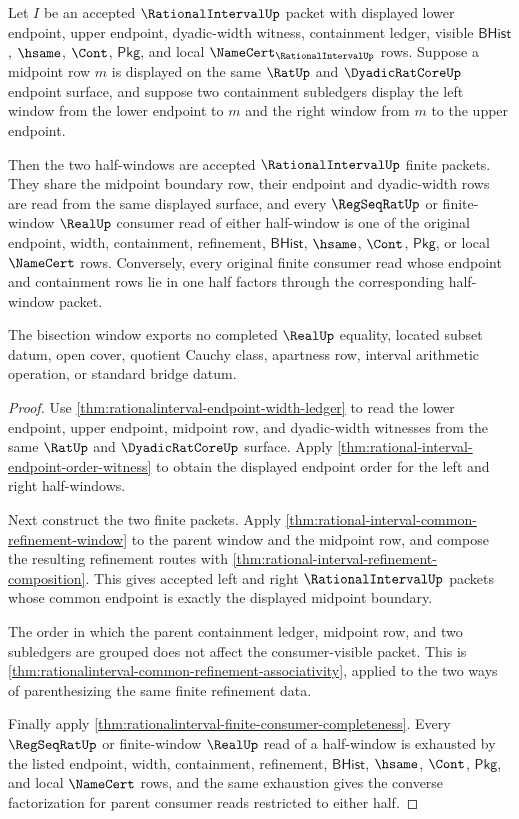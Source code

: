 \begin{theorem}
\label{thm:rationalinterval-midpoint-bisection-window}
Let $I$ be an accepted $\RationalIntervalUp$ packet with displayed lower
endpoint, upper endpoint, dyadic-width witness, containment ledger, visible
$\mathsf{BHist}$, $\hsame$, $\Cont$, $\mathsf{Pkg}$, and local
$\NameCert_{\RationalIntervalUp}$ rows. Suppose a midpoint row $m$ is displayed
on the same $\RatUp$ and $\DyadicRatCoreUp$ endpoint surface, and suppose two
containment subledgers display the left window from the lower endpoint to $m$
and the right window from $m$ to the upper endpoint.

Then the two half-windows are accepted $\RationalIntervalUp$ finite packets.
They share the midpoint boundary row, their endpoint and dyadic-width rows are
read from the same displayed surface, and every $\RegSeqRatUp$ or finite-window
$\RealUp$ consumer read of either half-window is one of the original endpoint,
width, containment, refinement, $\mathsf{BHist}$, $\hsame$, $\Cont$,
$\mathsf{Pkg}$, or local $\NameCert$ rows. Conversely, every original finite
consumer read whose endpoint and containment rows lie in one half factors
through the corresponding half-window packet.

The bisection window exports no completed $\RealUp$ equality, located subset
datum, open cover, quotient Cauchy class, apartness row, interval arithmetic
operation, or standard bridge datum.
\end{theorem}
\begin{proof}
Use \autoref{thm:rationalinterval-endpoint-width-ledger} to read the lower
endpoint, upper endpoint, midpoint row, and dyadic-width witnesses from the
same $\RatUp$ and $\DyadicRatCoreUp$ surface. Apply
\autoref{thm:rational-interval-endpoint-order-witness} to obtain the displayed
endpoint order for the left and right half-windows.

Next construct the two finite packets. Apply
\autoref{thm:rational-interval-common-refinement-window} to the parent window
and the midpoint row, and compose the resulting refinement routes with
\autoref{thm:rational-interval-refinement-composition}. This gives accepted
left and right $\RationalIntervalUp$ packets whose common endpoint is exactly
the displayed midpoint boundary.

The order in which the parent containment ledger, midpoint row, and two
subledgers are grouped does not affect the consumer-visible packet. This is
\autoref{thm:rationalinterval-common-refinement-associativity}, applied to the
two ways of parenthesizing the same finite refinement data.

Finally apply \autoref{thm:rationalinterval-finite-consumer-completeness}.
Every $\RegSeqRatUp$ or finite-window $\RealUp$ read of a half-window is
exhausted by the listed endpoint, width, containment, refinement,
$\mathsf{BHist}$, $\hsame$, $\Cont$, $\mathsf{Pkg}$, and local $\NameCert$
rows, and the same exhaustion gives the converse factorization for parent
consumer reads restricted to either half.
\end{proof}

